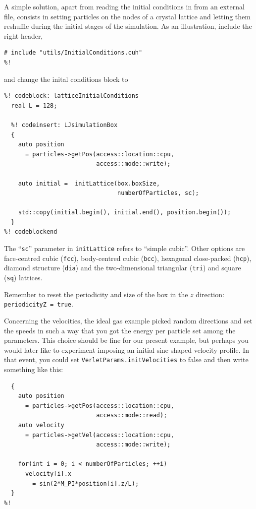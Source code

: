 A simple solution, apart from reading the initial conditions in from an external 
file, consists in setting particles on the nodes of a crystal lattice and 
letting them reshuffle during the initial stages of the simulation. As an
illustration, include the right header,
\begin{lstlisting}
# include "utils/InitialConditions.cuh"
%!
\end{lstlisting}
and change the inital conditions block to
\begin{lstlisting}
%! codeblock: latticeInitialConditions
  real L = 128;

  %! codeinsert: LJsimulationBox
  {
    auto position
      = particles->getPos(access::location::cpu,
                          access::mode::write);

    auto initial =  initLattice(box.boxSize,
                                numberOfParticles, sc);

    std::copy(initial.begin(), initial.end(), position.begin());
  }
%! codeblockend
\end{lstlisting}
The ``\texttt{sc}'' parameter in \texttt{initLattice} refers to ``simple
cubic''. Other options are face-centred cubic (\texttt{fcc}), body-centred cubic
(\texttt{bcc}), hexagonal close-packed (\texttt{hcp}), diamond structure
(\texttt{dia}) and the two-dimensional triangular (\texttt{tri}) and square
(\texttt{sq}) lattices.

Remember to reset the periodicity and size of the box in the $z$ direction:
\texttt{periodicityZ = true}.

Concerning the velocities, the ideal gas example picked random directions and set
the speeds in such a way that you got the energy per particle set among the
parameters. This choice should be fine for our present example, but perhaps you
would later like to experiment imposing an initial sine-shaped velocity profile.
In that event, you could set \texttt{VerletParams.initVelocities} to false and
then write something like this:
\begin{lstlisting}
  {
    auto position
      = particles->getPos(access::location::cpu,
                          access::mode::read);
    auto velocity
      = particles->getVel(access::location::cpu,
                          access::mode::write);

    for(int i = 0; i < numberOfParticles; ++i)
      velocity[i].x
        = sin(2*M_PI*position[i].z/L);
  }
%!
\end{lstlisting}

